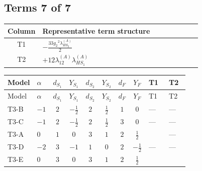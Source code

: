\documentclass[8pt]{article}
\begin{document}
\begin{landscape}
\subsection*{Terms 7 of 7}
\begin{center}
\begin{tabular}{@{}c >{\raggedright\arraybackslash}p{0.82\linewidth}@{}}
\toprule
Column & Representative term structure \\
\midrule
T1 & \(\displaystyle -\frac{33 {g_2}^2 {\lambda_{HS_2}^{(A)}}}{2}\) \\
\midrule
T2 & \(\displaystyle +12 {\lambda_{12}^{(A)}} {\lambda_{HS_1}^{(A)}}\) \\
\midrule
\bottomrule
\end{tabular}
\end{center}
\smallskip
\tiny
\begin{longtable}{@{}llcccccc >{\raggedright\arraybackslash}p{0.21\linewidth} >{\raggedright\arraybackslash}p{0.21\linewidth}@{}}
\toprule
Model & $\alpha$ & $d_{S_1}$ & $Y_{S_1}$ & $d_{S_2}$ & $Y_{S_2}$ & $d_F$ & $Y_F$ & T1 & T2 \\
\midrule
\endfirsthead
\toprule
Model & $\alpha$ & $d_{S_1}$ & $Y_{S_1}$ & $d_{S_2}$ & $Y_{S_2}$ & $d_F$ & $Y_F$ & T1 & T2 \\
\midrule
\endhead
T3-B & $-1$ & $2$ & $-\frac{1}{2}$ & $2$ & $\frac{1}{2}$ & $1$ & $0$ & --- & --- \\
\midrule
T3-C & $-1$ & $2$ & $-\frac{1}{2}$ & $2$ & $\frac{1}{2}$ & $3$ & $0$ & --- & --- \\
\midrule
T3-A & $0$ & $1$ & $0$ & $3$ & $1$ & $2$ & $\frac{1}{2}$ & \scriptsize\adjustbox{max width=\linewidth}{$\begin{gathered} -\frac{33 {g_2}^2 {\lambda_{HS_2}^{(A)}}}{2}\end{gathered}$} & --- \\
\midrule
T3-D & $-2$ & $3$ & $-1$ & $1$ & $0$ & $2$ & $-\frac{1}{2}$ & --- & --- \\
\midrule
T3-E & $0$ & $3$ & $0$ & $3$ & $1$ & $2$ & $\frac{1}{2}$ & \scriptsize\adjustbox{max width=\linewidth}{$\begin{gathered} -\frac{33 {g_2}^2 {\lambda_{HS_2}^{(A)}}}{2}\end{gathered}$} & \scriptsize\adjustbox{max width=\linewidth}{$\begin{gathered} +12 {\lambda_{12}^{(A)}} {\lambda_{HS_1}^{(A)}}\end{gathered}$} \\
\midrule
\bottomrule
\end{longtable}
\clearpage

\end{landscape}
\end{document}

